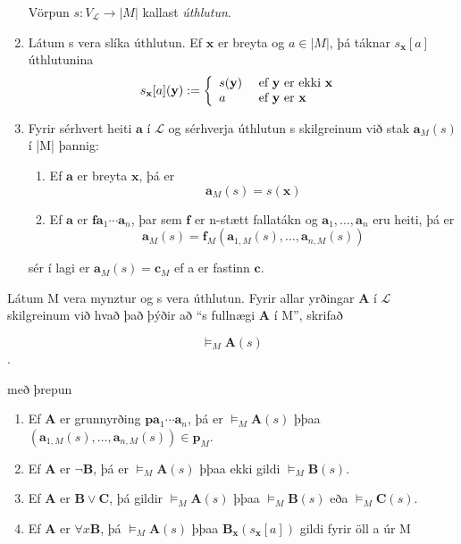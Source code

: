 \documentclass[12pt]{article}
\begin{document}
\begin{skgr}
\begin{enumerate}[(1)]
    Vörpun $s: V_{\mathcal{L}} \rightarrow |M|$ kallast \emph{úthlutun}.
  \item Látum s vera slíka úthlutun. Ef $\mathbf{x}$ er breyta og $a \in |M|$, þá táknar
    $s_{\mathbf{x}}[a]$ úthlutunina
    \[s_{\mathbf{x}}[a](\mathbf{y}) := \left\{ \begin{array}{l l} s(\mathbf{y}) & \text{ ef $\mathbf{y}$ er ekki $\mathbf{x}$ } \\ a & \text{ ef $\mathbf{y}$ er $\mathbf{x}$} \end{array} \right. \]
  \item Fyrir sérhvert heiti $\mathbf{a}$ í $\mathcal{L}$ og sérhverja úthlutun s skilgreinum við stak
    $\mathbf{a}_{M}(s)$ í |M| þannig:
    \begin{enumerate}[(1)]
    \item  Ef $\mathbf{a}$ er breyta $\mathbf{x}$, þá er 
      \[ \mathbf{a}_{M}(s) = s(\mathbf{x}) \]
    \item Ef $\mathbf{a}$ er $\mathbf{f} \mathbf{a}_1 \dotsb \mathbf{a}_n$, þar sem 
      $\mathbf{f}$ er n-stætt fallatákn og $\mathbf{a}_1, \dotsc, \mathbf{a}_n$ eru heiti,
      þá er
      \[ \mathbf{a}_{M} (s) = \mathbf{f}_{M}(\mathbf{a}_{1,M}(s), \dotsc, \mathbf{a}_{n,M}(s)) \]
    \end{enumerate}
    sér í lagi er $\mathbf{a}_{M}(s) = \mathbf{c}_M$ ef a er fastinn $\mathbf{c}$.
  \end{enumerate}
\end{skgr}

\begin{skgr}
  Látum M vera mynztur og s vera úthlutun. Fyrir allar yrðingar $\mathbf{A}$ í $\mathcal{L}$ skilgreinum
við hvað það þýðir að ``s fullnægi $\mathbf{A}$ í M'', skrifað

\[ \models_{M} \mathbf{A} (s) \].

með þrepun
\begin{enumerate}[(1)]
\item  Ef $\mathbf{A}$ er grunnyrðing $\mathbf{p} \mathbf{a}_1 \dotsb \mathbf{a}_n$,
  þá er $\models_{M} \mathbf{A} (s)$ þþaa $(\mathbf{a}_{1,M}(s), \dotsc, \mathbf{a}_{n,M}(s)) \in \mathbf{p}_{M}$.
\item Ef $\mathbf{A}$ er $\lnot \mathbf{B}$, þá er $\models_{M} \mathbf{A}(s)$ þþaa ekki gildi
  $\models_{M} \mathbf{B}(s)$.
\item Ef $\mathbf{A}$ er $\mathbf{B} \vee \mathbf{C}$, þá gildir 
  $\models_{M} \mathbf{A}(s)$ þþaa $\models_{M} \mathbf{B}(s)$ eða $\models_{M} \mathbf{C}(s)$.
\item Ef $\mathbf{A}$ er $\forall x \mathbf{B}$, þá $\models_{M} \mathbf{A}(s)$ þþaa
  $\mathbf{B}_{\mathbf{x}} (s_{\mathbf{x}}[a])$ gildi fyrir öll a úr M
\end{enumerate}

\end{skgr}
\end{document}

